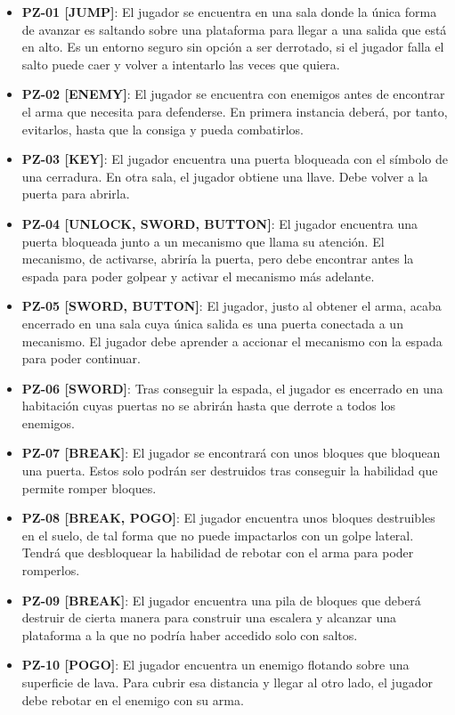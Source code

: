 \begin{itemize}
    \item \textbf{PZ-01 [JUMP]}: El jugador se encuentra en una sala donde la única forma de avanzar es saltando sobre una plataforma para llegar a una salida que está en alto. Es un entorno seguro sin opción a ser derrotado, si el jugador falla el salto puede caer y volver a intentarlo las veces que quiera.
    \item \textbf{PZ-02 [ENEMY]}: El jugador se encuentra con enemigos antes de encontrar el arma que necesita para defenderse. En primera instancia deberá, por tanto, evitarlos, hasta que la consiga y pueda combatirlos.
    \item \textbf{PZ-03 [KEY]}: El jugador encuentra una puerta bloqueada con el símbolo de una cerradura. En otra sala, el jugador obtiene una llave. Debe volver a la puerta para abrirla.
    \item \textbf{PZ-04 [UNLOCK, SWORD, BUTTON]}: El jugador encuentra una puerta bloqueada junto a un mecanismo que llama su atención. El mecanismo, de activarse, abriría la puerta, pero debe encontrar antes la espada para poder golpear y activar el mecanismo más adelante.
    \item \textbf{PZ-05 [SWORD, BUTTON]}: El jugador, justo al obtener el arma, acaba encerrado en una sala cuya única salida es una puerta conectada a un mecanismo. El jugador debe aprender a accionar el mecanismo con la espada para poder continuar.
    \item \textbf{PZ-06 [SWORD]}: Tras conseguir la espada, el jugador es encerrado en una habitación cuyas puertas no se abrirán hasta que derrote a todos los enemigos.
    \item \textbf{PZ-07 [BREAK]}: El jugador se encontrará con unos bloques que bloquean una puerta. Estos solo podrán ser destruidos tras conseguir la habilidad que permite romper bloques.
    \item \textbf{PZ-08 [BREAK, POGO]}: El jugador encuentra unos bloques destruibles en el suelo, de tal forma que no puede impactarlos con un golpe lateral. Tendrá que desbloquear la habilidad de rebotar con el arma para poder romperlos.
    \item \textbf{PZ-09 [BREAK]}: El jugador encuentra una pila de bloques que deberá destruir de cierta manera para construir una escalera y alcanzar una plataforma a la que no podría haber accedido solo con saltos.
    \item \textbf{PZ-10 [POGO]}: El jugador encuentra un enemigo flotando sobre una superficie de lava. Para cubrir esa distancia y llegar al otro lado, el jugador debe rebotar en el enemigo con su arma.

\end{itemize}
